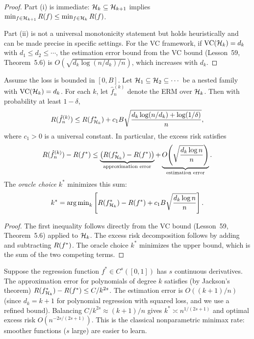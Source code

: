 \documentclass[11pt,a4paper]{article}
\begin{document}
\begin{proof}
Part (i) is immediate: $\mathcal{H}_k \subseteq \mathcal{H}_{k+1}$ implies
$\min_{f \in \mathcal{H}_{k+1}} R(f) \leq
\min_{f \in \mathcal{H}_k} R(f)$.

Part (ii) is not a universal monotonicity statement but holds
heuristically and can be made precise in specific settings.  For
the VC framework, if $\operatorname{VC}(\mathcal{H}_k) = d_k$ with $d_1 \leq d_2
\leq \cdots$, the estimation error bound from the VC bound
(Lesson~59, Theorem~5.6) is $O(\sqrt{d_k \log(n/d_k)/n})$,
which increases with $d_k$.
\end{proof}

\begin{theorem}
\label{thm:oracle_erm}
Assume the loss is bounded in $[0, B]$.  Let $\mathcal{H}_1 \subseteq
\mathcal{H}_2 \subseteq \cdots$ be a nested family with
$\operatorname{VC}(\mathcal{H}_k) = d_k$.  For each $k$, let $\hat{f}_n^{(k)}$
denote the ERM over $\mathcal{H}_k$.  Then with probability at least
$1 - \delta$,
\[
    R(\hat{f}_n^{(k)}) \leq R(f_{\mathcal{H}_k}^*)
    + c_1 B\sqrt{\frac{d_k \log(n/d_k) + \log(1/\delta)}{n}},
\]
where $c_1 > 0$ is a universal constant.  In particular, the excess
risk satisfies
\[
    R(\hat{f}_n^{(k)}) - R(f^*)
    \leq \underbrace{\bigl(R(f_{\mathcal{H}_k}^*) - R(f^*)\bigr)}_
    {\text{approximation error}}
    + \underbrace{O\!\left(\sqrt{\frac{d_k \log n}{n}}\right)}_
    {\text{estimation error}}.
\]
The \emph{oracle choice} $k^*$ minimizes this sum:
\[
    k^* = \operatorname{arg\,min}_k \left[R(f_{\mathcal{H}_k}^*) - R(f^*)
    + c_1 B\sqrt{\frac{d_k \log n}{n}}\right].
\]
\end{theorem}

\begin{proof}
The first inequality follows directly from the VC bound (Lesson~59,
Theorem~5.6) applied to $\mathcal{H}_k$.  The excess risk decomposition
follows by adding and subtracting $R(f^*)$.  The oracle choice
$k^*$ minimizes the upper bound, which is the sum of the two
competing terms.
\end{proof}

\begin{example}
\label{ex:optimal_degree}
Suppose the regression function $f^* \in C^s([0,1])$ has $s$
continuous derivatives.  The approximation error for polynomials of
degree $k$ satisfies (by Jackson's theorem)
$R(f_{\mathcal{H}_k}^*) - R(f^*) \leq C/k^{2s}$.  The
estimation error is $O((k+1)/n)$ (since $d_k = k + 1$ for
polynomial regression with squared loss, and we use a refined
bound).  Balancing $C/k^{2s} \approx (k+1)/n$ gives
$k^* \asymp n^{1/(2s+1)}$ and optimal excess risk
$O(n^{-2s/(2s+1)})$.  This is the classical nonparametric
minimax rate: smoother functions ($s$ large) are easier to learn.
\end{example}
\end{document}
